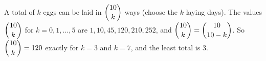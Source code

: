 A total of $k$ eggs can be laid in $\dbinom{10}{k}$ ways (choose the $k$ laying days). The values $\dbinom{10}{k}$ for $k=0,1,\dots,5$ are $1,10,45,120,210,252$, and $\dbinom{10}{k}=\dbinom{10}{10-k}$. So $\dbinom{10}{k}=120$ exactly for $k=3$ and $k=7$, and the least total is $\boxed{3}$.
